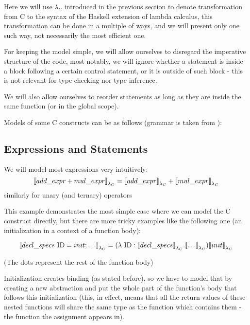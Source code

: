Here we will use $\lambda_C$ introduced in the previous section to denote transformation from C to the syntax of the Haskell extension of lambda calculus, this transformation can be done in a multiple of ways, and we will present only one such way, not necessarily the most efficient one.

For keeping the model simple, we will allow ourselves to disregard the imperative structure of the code, most notably, we will ignore whether a statement is inside a block following a certain control statement, or it is outside of such block - this is not relevant for type checking nor type inference.

We will also allow ourselves to reorder statements as long as they are inside the same function (or in the global scope).

Models of some C constructs can be as follows (grammar is taken from \cite{organisation1999iso}):

\subsection{Expressions and Statements}
\label{ssec:exprStat}

\begin{defn}
    We will model most expressions very intuitively:
    $${\llbracket add\_expr + mul\_expr \rrbracket}_{\lambda_C} = {\llbracket add\_expr \rrbracket}_{\lambda_C} + {\llbracket mul\_expr \rrbracket}_{\lambda_C}$$
    similarly for unary (and ternary) operators
\end{defn}


This example demonstrates the most simple case where we can model the C construct directly, but there are more tricky examples like the following one (an initialization in a context of a function body):

\begin{defn}
    $${\llbracket decl\_specs\ \text{ID} =init; \dots \rrbracket}_{\lambda_C} = (\lambda\ \text{ID} : {\llbracket decl\_specs \rrbracket}_{\lambda_C} . {\llbracket \dots \rrbracket}_{\lambda_C}) {\llbracket init \rrbracket}_{\lambda_C}$$
\end{defn}

(The dots represent the rest of the function body)

Initialization creates binding (as stated before), so we have to model that by creating a new abstraction and put the whole part of the function's body that follows this initialization (this, in effect, means that all the return values of these nested functions will share the same type as the function which contains them - the function the assignment appears in).

